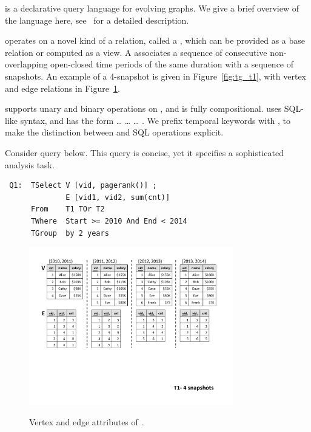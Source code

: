 \ql is a declarative query language for evolving graphs.  We give a
brief overview of the language here, see~\cite{PortalarXiv2016} for a
detailed description.

\ql operates on a novel kind of a relation, called a \tg, which can be
provided as a base relation or computed as a view.  A \tg associates a
sequence of consecutive non-overlapping open-closed time periods of
the same duration with a sequence of snapshots.  An example of a
4-snapshot \tg is given in Figure~\ref{fig:tg_t1}, with vertex and
edge relations in Figure~\ref{fig:tg_t1_ve}.


\ql supports unary and binary operations on \tgs, and is fully
compositional. \ql uses SQL-like syntax, and has the form
 \ldots {} \ldots {} \ldots
{}.  We prefix temporal keywords with , to make
the distinction between \ql and SQL operations explicit. 


Consider query  below.  This query is concise, yet it
specifies a sophisticated analysis task.

\eat{{\footnotesize}}
\begin{small}
\begin{verbatim}
 Q1:  TSelect V [vid, pagerank()] ; 
              E [vid1, vid2, sum(cnt)] 
      From    T1 TOr T2 
      TWhere  Start >= 2010 And End < 2014 
      TGroup  by 2 years
\end{verbatim}
\end{small}

\begin{figure}[t!]
  \centering
\includegraphics[width=3.5in]{figs/4snaps_T1_ve.pdf}
  \vspace{-0.5cm}
  \caption{Vertex and edge attributes of \tg {}.}{}
  \label{fig:tg_t1_ve}
\vspace{-0.3cm}
\end{figure}

